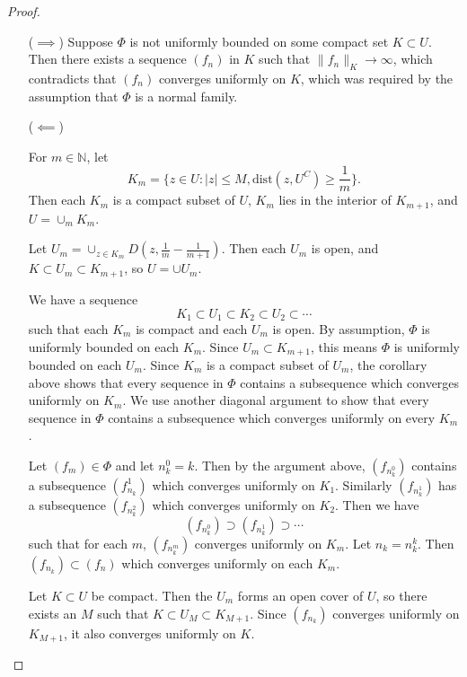 \begin{proof}
  \begin{itemize}
    \item[($\implies$)]{
      Suppose $\Phi$ is not uniformly bounded on some compact set $K
      \subset U$. Then there exists a sequence $(f_n)$ in $K$ such
      that $\| f_n \|_K \to \infty$, which contradicts that $(f_n)$
      converges uniformly on $K$, which was required by the assumption
      that $\Phi$ is a normal family.
    }
    \item[($\impliedby$)]{
      For $m \in \mathbb{N}$, let
      $$
        K_m
      = \{ z \in U : |z| \leq M, \mathrm{dist}(z, U^C) \geq
      \frac{1}{m} \}.
      $$
      Then each $K_m$ is a compact subset of $U$, $K_m$ lies in the
      interior of $K_{m+1}$, and $U = \cup_m K_m$.

      Let $U_m = \cup_{z \in K_m} D(z, \frac{1}{m} - \frac{1}{m +
        1})$.
      Then each $U_m$ is open, and $K \subset U_m \subset K_{m+1}$, so
      $U = \cup U_m$.

      We have a sequence
      $$
      K_1 \subset U_1 \subset K_2 \subset U_2 \subset \cdots
      $$
      such that each $K_m$ is compact and each $U_m$ is open.
      By assumption, $\Phi$ is uniformly bounded on each $K_m$.
      Since $U_m \subset K_{m+1}$, this means $\Phi$ is uniformly
      bounded on each $U_m$. Since $K_m$ is a compact subset of
      $U_m$, the corollary above shows that every sequence in
      $\Phi$ contains a subsequence which converges uniformly on
      $K_m$. We use another diagonal argument to show that every
      sequence in $\Phi$ contains a subsequence which converges
      uniformly on every $K_m$.

      Let $(f_m) \in \Phi$ and let $n^0_k = k$. Then by the argument
      above, $(f_{n^0_k})$ contains a subsequence $(f_{n_k}^1)$ which
      converges uniformly on $K_1$. Similarly $(f_{n^1_k})$ has a
      subsequence $(f_{n^2_k})$ which converges uniformly on $K_2$.
      Then we have
      $$
      (f_{n^0_k}) \supset (f_{n^1_k}) \supset \cdots
      $$
      such that for each $m$, $(f_{n^m_k})$ converges uniformly on
      $K_m$. Let $n_k = n^k_k$. Then $(f_{n_k}) \subset (f_n)$ which
      converges uniformly on each $K_m$.

      Let $K \subset U$ be compact. Then the $U_m$ forms an open cover
      of $U$, so there exists an $M$ such that $K \subset U_M \subset
      K_{M+1}$.
      Since $(f_{n_k})$ converges uniformly on $K_{M+1}$, it also
      converges uniformly on $K$.
    }
  \end{itemize}
\end{proof}

